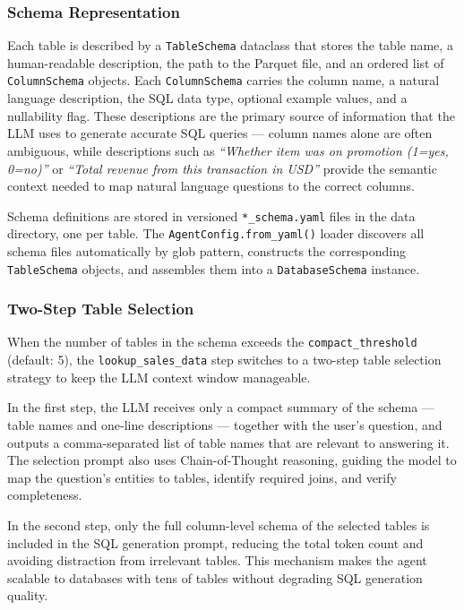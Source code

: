 \documentclass[11pt,a4paper]{article}
\begin{document}
\subsubsection{Schema Representation}

Each table is described by a \texttt{TableSchema} dataclass that stores the table
name, a human-readable description, the path to the Parquet file, and an ordered
list of \texttt{ColumnSchema} objects. Each \texttt{ColumnSchema} carries the column
name, a natural language description, the SQL data type, optional example values,
and a nullability flag. These descriptions are the primary source of information
that the LLM uses to generate accurate SQL queries — column names alone are often
ambiguous, while descriptions such as \textit{``Whether item was on promotion
(1=yes, 0=no)''} or \textit{``Total revenue from this transaction in USD''} provide
the semantic context needed to map natural language questions to the correct columns.

Schema definitions are stored in versioned \texttt{*\_schema.yaml} files in the
data directory, one per table. The \texttt{AgentConfig.from\_yaml()} loader
discovers all schema files automatically by glob pattern, constructs the
corresponding \texttt{TableSchema} objects, and assembles them into a
\texttt{DatabaseSchema} instance.

\subsubsection{Two-Step Table Selection}

When the number of tables in the schema exceeds the \texttt{compact\_threshold}
(default: 5), the \texttt{lookup\_sales\_data} step switches to a two-step table
selection strategy to keep the LLM context window manageable.

In the first step, the LLM receives only a compact summary of the schema — table
names and one-line descriptions — together with the user's question, and outputs a
comma-separated list of table names that are relevant to answering it. The selection
prompt also uses Chain-of-Thought reasoning, guiding the model to map the
question's entities to tables, identify required joins, and verify completeness.

In the second step, only the full column-level schema of the selected tables is
included in the SQL generation prompt, reducing the total token count and avoiding
distraction from irrelevant tables. This mechanism makes the agent scalable to
databases with tens of tables without degrading SQL generation quality.
\end{document}
